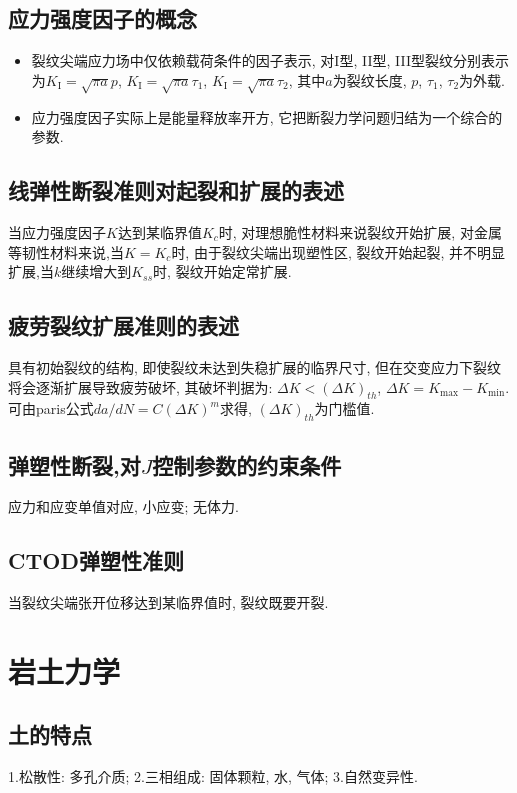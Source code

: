 \documentclass[a4paper,titlepage,twocolumn]{article}
\begin{document}
\subsection{应力强度因子的概念}
\begin{itemize}
\item 裂纹尖端应力场中仅依赖载荷条件的因子表示, 对I型, II型, III型裂纹分别表示为$K_{\mathrm{I}}=\sqrt{\pi a}p$, $K_{\mathrm{I}}=\sqrt{\pi a}\tau_1$, $K_{\mathrm{I}}=\sqrt{\pi a}\tau_2$, 其中$a$为裂纹长度, $p$, $\tau_1$, $\tau_2$为外载.

\item 应力强度因子实际上是能量释放率开方, 它把断裂力学问题归结为一个综合的参数.
\end{itemize}

\subsection{线弹性断裂准则对起裂和扩展的表述}
当应力强度因子$K$达到某临界值$K_c$时, 对理想脆性材料来说裂纹开始扩展, 对金属等韧性材料来说,当$K=K_c$时, 由于裂纹尖端出现塑性区, 裂纹开始起裂, 并不明显扩展,当$k$继续增大到$K_{ss}$时, 裂纹开始定常扩展.

\subsection{疲劳裂纹扩展准则的表述}
具有初始裂纹的结构, 即使裂纹未达到失稳扩展的临界尺寸, 但在交变应力下裂纹将会逐渐扩展导致疲劳破坏, 其破坏判据为: $\Delta K<(\Delta K)_{th}$, $\Delta K = K_{\max}-K_{\min}$. 可由paris公式$da/dN=C(\Delta K)^m$求得, $(\Delta K)_{th}$为门槛值.

\subsection{弹塑性断裂,对$J$控制参数的约束条件}
应力和应变单值对应, 小应变; 无体力.

\subsection{CTOD弹塑性准则}
当裂纹尖端张开位移达到某临界值时, 裂纹既要开裂.


\section{岩土力学}
\subsection{土的特点}
1.松散性: 多孔介质; 2.三相组成: 固体颗粒, 水, 气体; 3.自然变异性.
\end{document}
